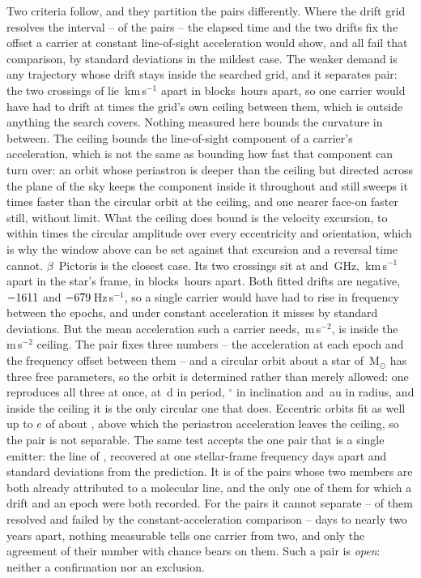 Two criteria follow, and they partition the pairs differently. Where the drift
grid resolves the interval -- \TjNPower{} of the \TjNPair{} pairs -- the
elapsed time and the two drifts fix the offset a carrier at constant
line-of-sight acceleration would show, and all \TjNPower{} fail that
comparison, by \TjSigMin{} standard deviations in the mildest case. The weaker
demand is any trajectory whose drift stays inside the searched grid, and it
separates \TjNExcl{} pair: the two crossings of \EcGridStar{} lie
\EcGridDvKms\,km\,s$^{-1}$ apart in blocks \EcGridDtH\,hours apart, so one
carrier would have had to drift at \EcGridFactor{} times the grid's own
ceiling between them, which is outside anything the search covers. Nothing
measured here bounds the curvature in between. The ceiling bounds the
line-of-sight component of a carrier's acceleration, which is not the same as
bounding how fast that component can turn over: an orbit whose periastron is
deeper than the ceiling but directed across the plane of the sky keeps the
component inside it throughout and still sweeps it \EcRateSupFac{} times
faster than the circular orbit at the ceiling, and one nearer face-on faster
still, without limit. What the ceiling does bound is the velocity
excursion, to within \EcVsupFac{} times the circular amplitude over every
eccentricity and orientation, which is why the window above can be set against
that excursion and a reversal time cannot.
$\beta$~Pictoris is the closest case. Its two crossings sit at \TjBpNuLo{}
and \TjBpNuHi\,GHz, \TjBpDvKms\,km\,s$^{-1}$ apart in the star's frame, in
blocks \TjBpDtH\,hours apart. Both fitted drifts are negative,
$-1611$ and $-679$\,Hz\,s$^{-1}$, so a single carrier would
have had to rise in frequency between the epochs, and under constant
acceleration it misses by \TjBpNSig{} standard deviations. But the mean
acceleration such a carrier needs, \TjBpAccelReq\,m\,s$^{-2}$, is inside the
\WdAGrid\,m\,s$^{-2}$ ceiling. The pair fixes three numbers -- the
acceleration at each epoch and the frequency offset between them -- and a
circular orbit about a star of \EcMassBp\,M$_\odot$ \citep{Crifo1997} has
three free parameters, so the orbit is determined rather than merely
allowed: one reproduces all three at once, at \ObDayBp\,d in period,
\ObIncBp$^\circ$ in inclination and \ObAuBp\,au in radius, and inside the
ceiling it is the only circular one that does. Eccentric orbits fit as well
up to $e$ of about \ObEccMaxBp, above which the periastron acceleration
leaves the ceiling, so the pair is not separable. The same test accepts the one pair that is a single emitter: the
\TjCtlLine{} line of \TjCtlStar, recovered at one stellar-frame frequency
\TjCtlDtD{} days apart and \TjCtlNSig{} standard deviations from the
prediction. It is \TjNCandAttrTest{} of the \TjNCandAttr{} pairs whose two
members are both already attributed to a molecular line, and the only one of
them for which a drift and an epoch were both recorded. For the \TjNOpen{} pairs
it cannot
separate -- \TjNPowerOpen{} of them resolved and failed by the
constant-acceleration comparison -- \TjDtOpenMinD{} days to nearly two years
apart, nothing measurable tells one carrier from two, and only the agreement
of their number with chance bears on them. Such a pair is \emph{open}:
neither a confirmation nor an exclusion.

